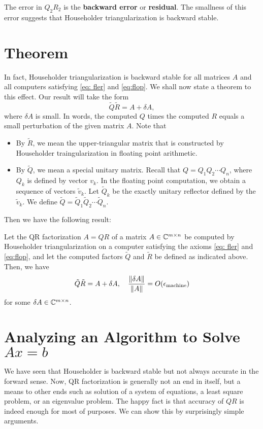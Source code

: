 The error in $Q_2 R_2$ is the \textbf{backward error} or \textbf{residual}. The smallness of this error suggests that Householder triangularization is backward stable.

\section{Theorem}
In fact, Householder triangularization is backward stable for all matrices $A$ and all computers satisfying \eqref{eq: fler} and \eqref{eq:flop}. We shall now state a theorem to this effect. Our result will take the form 
\[
    \tilde Q \tilde R = A + \delta  A, 
\]
where $\delta A$ is small.  In words, the computed $Q$ times the computed $R$ equals a small perturbation of the given matrix $A$. Note that 
\begin{itemize}
    \item By $\tilde R$, we mean the upper-triangular matrix that is constructed by Householder traingularization in floating point arithmetic. 
    \item By $\tilde Q$, we mean a special unitary matrix. Recall that $Q = Q_1Q_2 \cdots Q_n$, where $Q_k$ is defined by vector $v_k$. In the floating point computation, we obtain a sequence of vectors $\tilde v_k$. Let $\tilde Q_k$ be the exactly unitary reflector defined by the $\tilde v_k$. We define $\tilde Q = \tilde Q_1 \tilde Q_2 \cdots \tilde Q_n$. 
\end{itemize}
Then we have the following result: 

\begin{theorem}
\label{thm: Back stap of Householder}
Let the QR factorization $A= QR$ of a matrix $A\in \mathbb{C}^{m\times n}$ be computed by Householder triangularization on a computer satisfying the axioms \eqref{eq: fler} and \eqref{eq:flop}, and let the computed factors $\tilde Q$ and $\tilde R$ be defined as indicated above. Then, we have 
\begin{equation}
    \label{eq: backstap of Householder}
    \tilde Q \tilde R = A + \delta  A,  \quad \frac{\|\delta A\|}{\|A\|} = O(\epsilon_{\text{machine}})
\end{equation}
for some $\delta A \in \mathbb{C}^{m\times n}$.  
\end{theorem}

\section{Analyzing an Algorithm to Solve $Ax=b$}
We have seen that Householder is backward stable but not always accurate in the forward sense. Now, QR factorization is generally not an end in itself, but a means to other ends such as solution of a system of equations, a least square problem, or an eigenvalue problem. The happy fact is that accuracy of $QR$ is indeed enough for most of purposes.   We can show this by surprisingly simple arguments. 

